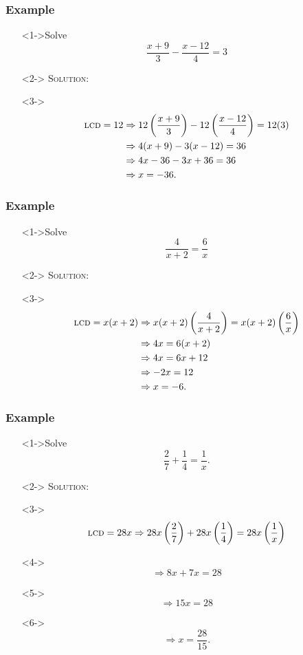 \documentclass[handout]{beamer}
\begin{document}
\begin{frame}
	\frametitle{Example} 
	\begin{enumerate}
		\item[]<1->Solve 
		\[
			\frac{x+9}{3}-\frac{x-12}{4}=3
		\]
		\item[]<2-> \textsc{Solution:} 
		\item[]<3-> 
		\begin{align*}
			\text{\textsc{lcd}}=12 & \Rightarrow 12 \left( \frac{x+9}{3} \right)-12 \left( \frac{x-12}{4} \right)=12(3)  \\
			& \Rightarrow 4(x+9)-3(x-12)=36 \\
			& \Rightarrow 4x-36-3x+36=36 \\
			& \Rightarrow x=-36.  
		\end{align*}
	\end{enumerate}
\end{frame}

\begin{frame}
	\frametitle{Example} 
	\begin{enumerate}
		\item[]<1->Solve 
		\[
			\frac{4}{x+2}=\frac{6}{x}
		\]
		\item[]<2-> \textsc{Solution:} 
		\item[]<3-> 
		\begin{align*}
			\text{\textsc{lcd}}=x(x+2) & \Rightarrow x(x+2) \left( \frac{4}{x+2} \right)=x(x+2) \left( \frac{6}{x} \right) \\
			& \Rightarrow 4x=6(x+2) \\
			& \Rightarrow 4x=6x+12 \\
			& \Rightarrow -2x=12 \\
			& \Rightarrow x=-6.  
		\end{align*}
	\end{enumerate}
\end{frame}

\begin{frame}
	\frametitle{Example}
	\begin{enumerate}
		\item[]<1->Solve 
		\[
			\frac{2}{7}+\frac{1}{4}=\frac{1}{x}. 
		\]
		\item[]<2-> \textsc{Solution:} 
		\item[]<3-> \[ \text{\textsc{lcd}}=28x \Rightarrow 28x \left( \frac{2}{7} \right)+28x\left(\frac{1}{4} \right) =28x \left( \frac{1}{x} \right) \] 
		\item[]<4-> \[ \Rightarrow 8x+7x=28 \] 
		\item[]<5-> \[ \Rightarrow 15x=28 \] 
		\item[]<6-> \[ \Rightarrow x=\frac{28}{15}. \] 
	\end{enumerate}
\end{frame}
\end{document}
